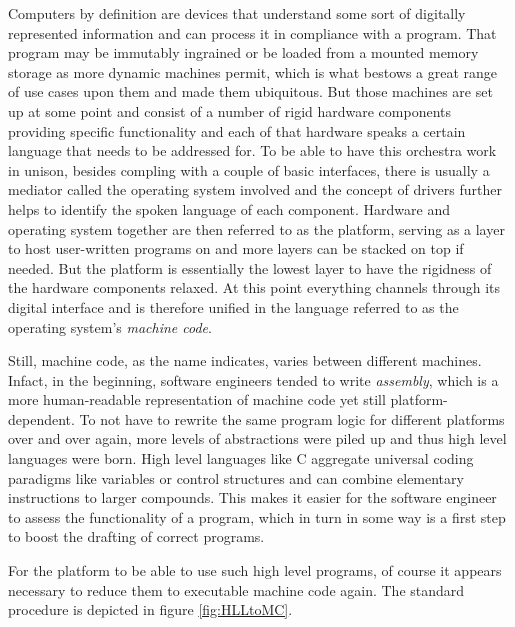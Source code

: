 Computers by definition are devices that understand some sort of digitally represented information and can process it in compliance with a program. That program may be immutably ingrained or be loaded from a mounted memory storage as more dynamic machines permit, which is what bestows a great range of use cases upon them and made them ubiquitous. But those machines are set up at some point and consist of a number of rigid hardware components providing specific functionality and each of that hardware speaks a certain language that needs to be addressed for. To be able to have this orchestra work in unison, besides compling with a couple of basic interfaces, there is usually a mediator called the operating system involved and the concept of drivers further helps to identify the spoken language of each component. Hardware and operating system together are then referred to as the platform, serving as a layer to host user-written programs on and more layers can be stacked on top if needed. But the platform is essentially the lowest layer to have the rigidness of the hardware components relaxed. At this point everything channels through its digital interface and is therefore unified in the language referred to as the operating system's \textit{machine code}.

Still, machine code, as the name indicates, varies between different machines. Infact, in the beginning, software engineers tended to write \textit{assembly}, which is a more human-readable representation of machine code yet still platform-dependent. To not have to rewrite the same program logic for different platforms over and over again, more levels of abstractions were piled up and thus high level languages were born. High level languages like C aggregate universal coding paradigms like variables or control structures and can combine elementary instructions to larger compounds. This makes it easier for the software engineer to assess the functionality of a program, which in turn in some way is a first step to boost the drafting of correct programs.

For the platform to be able to use such high level programs, of course it appears necessary to reduce them to executable machine code again. The standard procedure is depicted in figure \ref{fig:HLLtoMC}.

